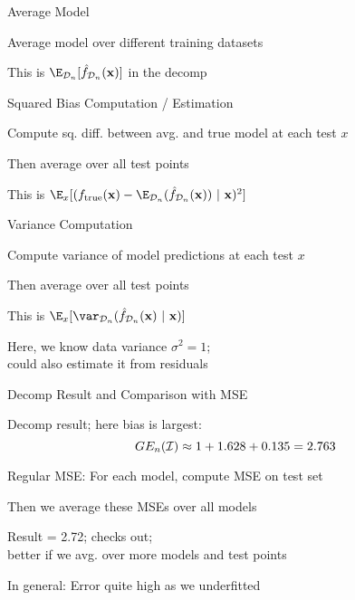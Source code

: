 \documentclass[11pt,compress,t,notes=noshow, xcolor=table]{beamer}
\begin{document}
\begin{framei}[sep=L]{Average Model}

\item Average model over different training datasets
\item This is $\E_{\D_n}[\fh_{\D_n}(\xv)]$ in the decomp


\end{framei} 


\begin{framei}[sep=M]{Squared Bias Computation / Estimation}

\item Compute sq. diff. between avg. and true model at each test $x$
\item Then average over all test points
\item This is 
$ 
\E_x[ ( \ftrue(\xv)-\E_{\D_n} (\fh_{\D_n}(\xv) )~|~\xv)^2]
$




\end{framei} 


\begin{framei}[sep=M]{Variance Computation}

\item Compute variance of model predictions at each test $x$
\item Then average over all test points
\item This is 
$
\E_{x} [\var_{\D_n} (\fh_{\D_n}(\xv) ~|~\xv ) ]
$


\item Here, we know data variance $\sigma^2=1$;\\
could also estimate it from residuals

\end{framei} 


\begin{framei}[fs=small,sep=M]{Decomp Result and Comparison with MSE}

\item Decomp result; here bias is largest:
$$GE_n(\mathcal{I}) \approx 1 + 1.628 + 0.135 = 2.763 $$


\item Regular MSE: For each model, compute MSE on test set
\item Then we average these MSEs over all models
\item Result = 2.72; checks out; \\
better if we avg. over more models and test points 
\item In general: Error quite high as we underfitted

\end{framei}
\end{document}
